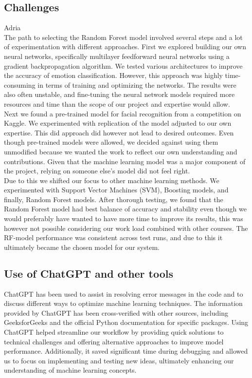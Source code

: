 \documentclass[conference]{IEEEtran}
\begin{document}
\subsection{Challenges}
Adria\\
The path to selecting the Random Forest model involved several steps and a lot of experimentation with different approaches. First we explored building our own neural networks, specifically multilayer feedforward neural networks using a gradient backpropagation algorithm. We tested various architectures to improve the accuracy of emotion classification. However, this approach was highly time-consuming in terms of training and optimizing the networks. The results were also often unstable, and fine-tuning the neural network models required more resources and time than the scope of our project and expertise would allow.
\\
Next we found a pre-trained model for facial recognition from a competition on Kaggle\cite{kaggle}. We experimented with replication of the model adjusted to our own expertise. This did approach did however not lead to desired outcomes. Even though pre-trained models were allowed, we decided against using them unmodified because we wanted the work to reflect our own understanding and contributions. Given that the machine learning model was a major component of the project, relying on someone else’s model did not feel right. \\
Due to this we shifted our focus to other machine learning methods. We experimented with Support Vector Machines (SVM), Boosting models, and finally, Random Forest models. After thorough testing, we found that the Random Forest model had best balance of accuracy and stability even though we would preferably have wanted to have more time to improve its results, this was however not possible considering our work load combined with other courses. The RF-model performance was consistent across test runs, and due to this it ultimately became the chosen model for our system.
\subsection{Use of ChatGPT and other tools}

ChatGPT has been used to assist in resolving error messages in the code and to discuss different ways to optimize machine learning techniques. The information provided by ChatGPT has been cross-verified with other sources, including GeeksforGeeks and the official Python documentation for specific packages. Using ChatGPT helped streamline our workflow by providing quick solutions to technical challenges and offering alternative approaches to improve model performance. Additionally, it saved significant time during debugging and allowed us to focus on implementing and testing new ideas, ultimately enhancing our understanding of machine learning concepts.
\end{document}
